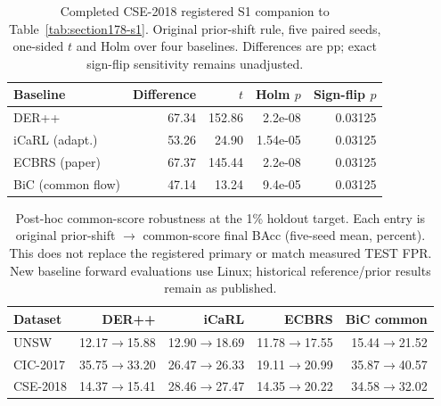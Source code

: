 \begin{table}[htbp]\centering\small
\caption{Completed CSE-2018 registered S1 companion to Table~\ref{tab:section178-s1}. Original prior-shift rule, five paired seeds, one-sided $t$ and Holm over four baselines. Differences are pp; exact sign-flip sensitivity remains unadjusted.}
\label{tab:cse-completed-s1}
\scriptsize\setlength{\tabcolsep}{3pt}
\begin{tabular}{lrrrr}\toprule
Baseline & Difference & $t$ & Holm $p$ & Sign-flip $p$\\\midrule
DER++ & 67.34 & 152.86 & 2.2e-08 & 0.03125\\
iCaRL (adapt.) & 53.26 & 24.90 & 1.54e-05 & 0.03125\\
ECBRS (paper) & 67.37 & 145.44 & 2.2e-08 & 0.03125\\
BiC (common flow) & 47.14 & 13.24 & 9.4e-05 & 0.03125\\
\bottomrule\end{tabular}\end{table}
\begin{table}[t]\centering\small
\caption{Post-hoc common-score robustness at the 1\% holdout target. Each entry is original prior-shift $\rightarrow$ common-score final BAcc (five-seed mean, percent). This does not replace the registered primary or match measured TEST FPR. New baseline forward evaluations use Linux; historical reference/prior results remain as published.}
\label{tab:same-score-completed}
\begin{tabular}{lrrrr}\toprule
Dataset & DER++ & iCaRL & ECBRS & BiC common\\\midrule
UNSW & 12.17$\rightarrow$15.88 & 12.90$\rightarrow$18.69 & 11.78$\rightarrow$17.55 & 15.44$\rightarrow$21.52\\
CIC-2017 & 35.75$\rightarrow$33.20 & 26.47$\rightarrow$26.33 & 19.11$\rightarrow$20.99 & 35.87$\rightarrow$40.57\\
CSE-2018 & 14.37$\rightarrow$15.41 & 28.46$\rightarrow$27.47 & 14.35$\rightarrow$20.22 & 34.58$\rightarrow$32.02\\
\bottomrule\end{tabular}\end{table}
